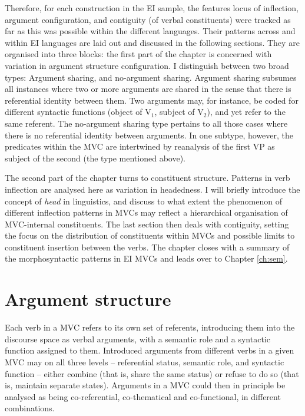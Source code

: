 Therefore, for each construction in the EI sample, the features locus of inflection, argument configuration, and contiguity (of verbal constituents) were tracked as far as this was possible within the different languages. Their patterns across and within EI languages are laid out and discussed in the following sections. They are organised into three blocks: the first part of the chapter is concerned with variation in argument structure configuration. I distinguish between two broad types: Argument sharing, and no-argument sharing. Argument sharing subsumes all instances where two or more arguments are shared in the sense that there is referential identity between them. Two arguments may, for instance, be coded for different syntactic functions (object of V$_1$, subject of V$_2$), and yet refer to the same referent. The no-argument sharing type pertains to all those cases where there is no referential identity between arguments. In one subtype, however, the predicates within the MVC are intertwined by reanalysis of the first VP as subject of the second (the  type mentioned above).

The second part of the chapter turns to constituent structure. Patterns in verb inflection are analysed here as variation in headedness. I will briefly introduce the concept of \textit{head} in linguistics, and discuss to what extent the phenomenon of different inflection patterns in MVCs may reflect a hierarchical organisation of MVC-internal constituents. The last section then deals with contiguity, setting the focus on the distribution of constituents within MVCs and possible limits to constituent insertion between the verbs. The chapter closes with a summary of the morphosyntactic patterns in EI MVCs and leads over to Chapter \ref{ch:sem}.

\section{Argument structure}\label{sec:argumentstructure}

Each verb in a MVC refers to its own set of referents, introducing them into the discourse space as verbal arguments, with a semantic role and a syntactic function assigned to them. Introduced arguments from different verbs in a given MVC may on all three levels -- referential status, semantic role, and syntactic function -- either combine (that is, share the same status) or refuse to do so (that is, maintain separate states). Arguments in a MVC could then in principle be analysed as being co-referential, co-thematical and co-functional, in different combinations. 

